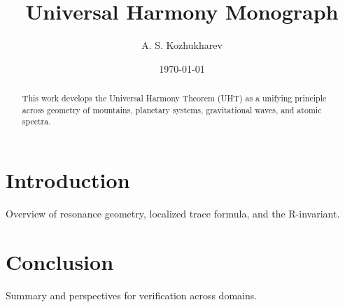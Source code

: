\documentclass[12pt,a4paper]{article}
\title{Universal Harmony Monograph}
\author{A. S. Kozhukharev}
\date{\today}
\begin{document}
\maketitle

\begin{abstract}
This work develops the Universal Harmony Theorem (UHT) as a unifying principle across geometry of mountains, planetary systems, gravitational waves, and atomic spectra.
\end{abstract}

\section{Introduction}
Overview of resonance geometry, localized trace formula, and the R-invariant.



\section{Conclusion}
Summary and perspectives for verification across domains.



\end{document}
